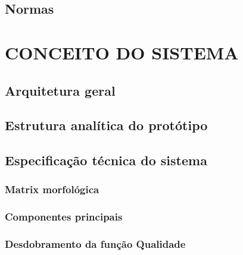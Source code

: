 \section{Normas}
\label{sec:normas}

\chapter{CONCEITO DO SISTEMA}
\label{chap:sist}

\section{Arquitetura geral}
\label{sec:arqger}

\section{Estrutura analítica do protótipo}
\label{sec:eap}

\section{Especificação técnica do sistema}
\label{sec:esptec}

\subsection{Matrix morfológica}
\label{sec:mtxmorf}

\subsection{Componentes principais}
\label{sec:compprinc}

\subsection{Desdobramento da função Qualidade}
\label{sec:qfd}

